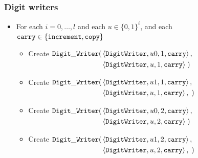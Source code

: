     \subsubsection{ Digit writers }
        \begin{itemize}
            \item For each $i = 0,\ldots,l$ and each $u \in \{0, 1\}^i$, and
                  each ${\tt carry} \in \{{\tt increment}, {\tt copy} \}$
                  \begin{itemize}
                    \item Create
                        $\begin{aligned}[t]
                            {\tt Digit\_Writer}(& \left\langle {\tt DigitWriter}, u0, 1,  {\tt carry} \right\rangle, \\
                                     & \left\langle {\tt DigitWriter}, u, 1,   {\tt carry} \right\rangle \;)
                        \end{aligned}$

                    \item Create
                    $\begin{aligned}[t]
                        {\tt Digit\_Writer}(& \left\langle {\tt DigitWriter}, u1, 1,  {\tt carry} \right\rangle, \\
                                 & \left\langle {\tt DigitWriter}, u, 1, {\tt carry} \right\rangle, \;)
                    \end{aligned}$

                    \item Create
                    $\begin{aligned}[t]
                        {\tt Digit\_Writer}(& \left\langle {\tt DigitWriter}, u0, 2, {\tt carry} \right\rangle, \\
                                 & \left\langle {\tt DigitWriter}, u,  2, {\tt carry} \right\rangle \;)
                    \end{aligned}$

                    \item Create
                    $\begin{aligned}[t]
                        {\tt Digit\_Writer}(& \left\langle {\tt DigitWriter}, u1, 2, {\tt carry} \right\rangle, \\
                                 & \left\langle {\tt DigitWriter}, u,  2, {\tt carry} \right\rangle, \;)
                    \end{aligned}$


\end{itemize}
\end{itemize}
